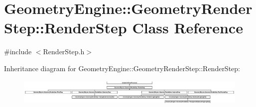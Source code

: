 \hypertarget{class_geometry_engine_1_1_geometry_render_step_1_1_render_step}{}\section{Geometry\+Engine\+::Geometry\+Render\+Step\+::Render\+Step Class Reference}
\label{class_geometry_engine_1_1_geometry_render_step_1_1_render_step}


{\ttfamily \#include $<$Render\+Step.\+h$>$}

Inheritance diagram for Geometry\+Engine\+::Geometry\+Render\+Step\+::Render\+Step\+:\begin{figure}[H]
\begin{center}
\leavevmode
\includegraphics[height=1.264108cm]{class_geometry_engine_1_1_geometry_render_step_1_1_render_step}
\end{center}
\end{figure}
